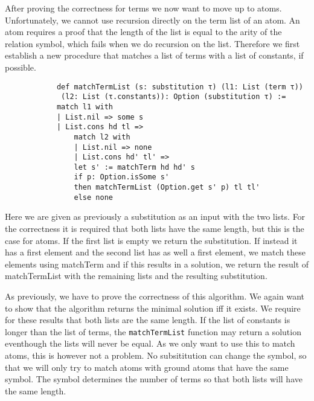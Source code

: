 \documentclass{article}
\begin{document}
        After proving the correctness for terms we now want to move up to atoms. Unfortunately, we cannot use recursion directly on the term list of an atom. An atom requires a proof that the length of the list is equal to the arity of the relation symbol, which fails when we do recursion on the list. Therefore we first establish a new procedure that matches a list of terms with a list of constants, if possible.
        
        \begin{lstlisting}
            def matchTermList (s: substitution τ) (l1: List (term τ))
             (l2: List (τ.constants)): Option (substitution τ) :=
            match l1 with
            | List.nil => some s
            | List.cons hd tl =>
                match l2 with
                | List.nil => none
                | List.cons hd' tl' =>
                let s' := matchTerm hd hd' s
                if p: Option.isSome s'
                then matchTermList (Option.get s' p) tl tl'
                else none
        \end{lstlisting}

        Here we are given as previously a substitution as an input with the two lists. For the correctness it is required that both lists have the same length, but this is the case for atoms. If the first list is empty we return the substitution. If instead it has a first element and the second list has as well a first element, we match these elements using matchTerm and if this results in a solution, we return the result of matchTermList with the remaining lists and the resulting substitution.

        As previously, we have to prove the correctness of this algorithm. We again want to show that the algorithm returns the minimal solution iff it exists. We require for these results that both lists are the same length. If the list of constants is longer than the list of terms, the \texttt{matchTermList} function may return a solution eventhough the lists will never be equal. As we only want to use this to match atoms, this is however not a problem. No subsititution can change the symbol, so that we will only try to match atoms with ground atoms that have the same symbol. The symbol determines the number of terms so that both lists will have the same length.
\end{document}
